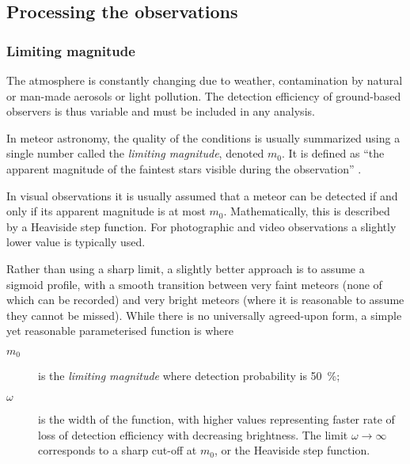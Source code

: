     \subsection{Processing the observations} \label{msp}
        \subsubsection{Limiting magnitude} \label{mspm}
            The atmosphere is constantly changing due to weather, contamination
            by natural or man-made aerosols or light pollution. The detection efficiency
            of ground-based observers is thus variable and must be included in any analysis.

            In meteor astronomy, the quality of the conditions is usually summarized
            using a single number called the \emph{limiting magnitude}, denoted $m_0$.
            It is defined as ``the apparent magnitude of the faintest stars visible during the observation'' \citep{imo-glossary}.

            In visual observations it is usually assumed that a meteor can be detected if and only if
            its apparent magnitude is at most $m_0$. Mathematically, this is described by a Heaviside step function.
            For photographic and video observations a slightly lower value is typically used.

            Rather than using a sharp limit, a slightly better approach is to assume a sigmoid profile,
            with a smooth transition between very faint meteors (none of which can be recorded)
            and very bright meteors (where it is reasonable to assume they cannot be missed).
            While there is no universally agreed-upon form, a simple yet reasonable parameterised function is
            where
            \begin{description}
                \item[$m_0$]    is the \textit{limiting magnitude} where detection probability is \SI{50}{\percent};
                \item[$\omega$] is the width of the function, with higher values representing
                    faster rate of loss of detection efficiency with decreasing brightness.
                    The limit $\omega \to \infty$ corresponds to a sharp cut-off at $m_0$,
                    or the Heaviside step function.
            \end{description}

